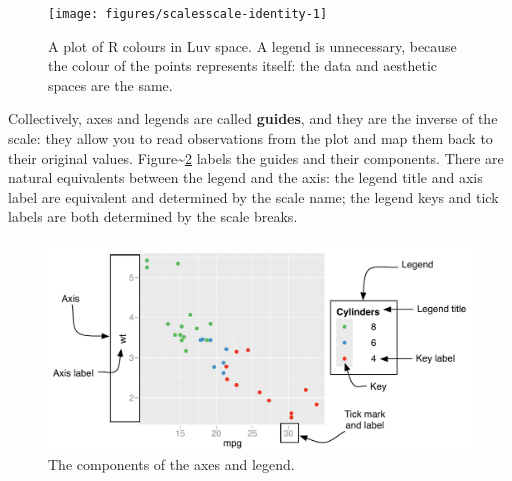 \begin{Shaded}
\begin{Highlighting}[]
\StringTok{ }\NormalTok{()}
\StringTok{ }\NormalTok{(}\NormalTok{(}\NormalTok{(}\NormalTok{, }\NormalTok{))}
  \NormalTok{(}\NormalTok{)) +}\StringTok{ }\NormalTok{() +}
\StringTok{   }\NormalTok{()}
\end{Highlighting}
\end{Shaded}

\begin{figure}
\texttt{[image: figures/scalesscale-identity-1]} \caption{A plot of R colours in Luv space.  A legend is unnecessary, because the colour of the points represents itself: the data and aesthetic spaces are the same.\label{fig:scale-identity}}
\end{figure}


Collectively, axes and legends are called \textbf{guides}, and they are
the inverse of the scale: they allow you to read observations from the
plot and map them back to their original values.
Figure\textasciitilde{}\ref{fig:labelled-guides} labels the guides and
their components. There are natural equivalents between the legend and
the axis: the legend title and axis label are equivalent and determined
by the scale name; the legend keys and tick labels are both determined
by the scale breaks. 

\begin{figure}[htbp]
  \centering
  \includegraphics[width=\linewidth]{diagrams/scale-guides}
  \caption{The components of the axes and legend.}
  \label{fig:labelled-guides}
\end{figure}


